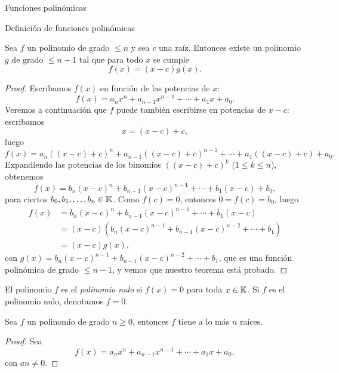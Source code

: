 \begin{chapter}{Funciones polinómicas}
\begin{section}{Definición de funciones polinómicas}
        \begin{teorema}\label{th-fact-raiz}
             Sea $f$ un polinomio de grado $\le n$ y sea $c$ una raíz. Entonces existe un polinomio $g$ de grado $\le n - 1$ tal que para todo $x$ se cumple
             \begin{equation*}
                 f (x) = (x - c) g (x).
             \end{equation*}
        \end{teorema}
        \begin{proof} Escribamos $f(x)$ en función de las potencias de  $x$:
        \begin{equation*}
            f(x) = a_nx^n + a_{n-1}x^{n-1}+\cdots + a_1x +a_0.
        \end{equation*}
         Veremos a continuación que $f$ puede también escribirse en potencias de $x-c$: escribamos 
         \begin{equation*}
             x = (x-c)+ c,
         \end{equation*}
         luego 
         \begin{equation*}
         f(x) = a_n((x-c)+ c)^n + a_{n-1}((x-c)+ c)^{n-1}+\cdots + a_1((x-c)+ c) +a_0.
         \end{equation*}
         Expandiendo las potencias de los binomios $((x-c)+ c)^k$ ($1 \le k \le n$),  obtenemos
         \begin{equation*}
         f(x) = b_n(x-c)^n + b_{n-1}(x-c)^{n-1}+\cdots + b_1(x-c) +b_0,
         \end{equation*}
         para ciertos $b_0, b_1,\ldots ,b_n \in \mathbb K$. Como $f(c) = 0$,  entonces $0=f(c)=b_0$,  luego 
         \begin{align*}
             f(x) &= b_n(x-c)^n + b_{n-1}(x-c)^{n-1}+\cdots + b_1(x-c) \\
             &= (x-c)(b_n(x-c)^{n-1} + b_{n-1}(x-c)^{n-2}+\cdots + b_1) \\
             &=(x-c)g(x),
         \end{align*}
         con $g(x) =b_n(x-c)^{n-1} + b_{n-1}(x-c)^{n-2}+\cdots + b_1$,  que es una función polinómica de grado $\le n-1$, y vemos que nuestro teorema está probado.
        \end{proof}
            
        El polinomio $f$ es el \textit{polinomio nulo} si $f(x)=0$ para toda $x \in \mathbb K$. Si $f$ es el polinomio nulo,  denotamos $f =0$. 
            
        \begin{teorema}\label{th-pol-raiz}
            Sea $f$ un polinomio de grado $n \ge 0$, entonces $f$ tiene a lo  más  $n$ raíces. 
        \end{teorema}
        \begin{proof} 
            Sea  
            \begin{equation*}
            f(x) = a_nx^n + a_{n-1}x^{n-1}+\cdots + a_1x +a_0,
            \end{equation*}
            con $an \ne 0$.


\end{proof}
\end{section}
\end{chapter}

